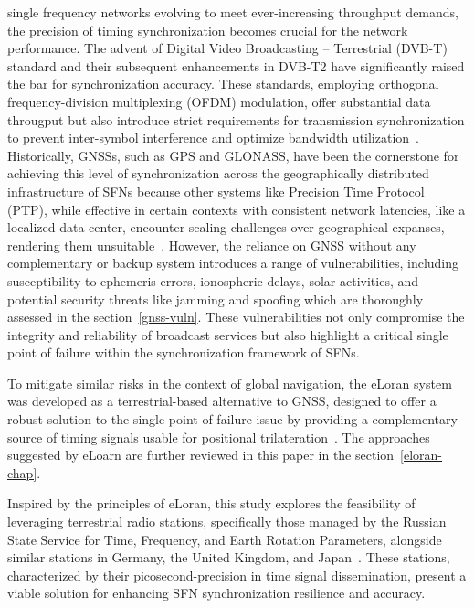 \documentclass[conference]{IEEEtran}
\begin{document}
 single frequency networks evolving to meet
ever-increasing throughput demands,  the precision of timing synchronization
becomes crucial for the network performance. The advent of Digital Video
Broadcasting -- Terrestrial (DVB-T) standard and their subsequent enhancements
in DVB-T2 have significantly raised the bar for synchronization accuracy. These
standards, employing orthogonal frequency-division multiplexing (OFDM)
modulation, offer substantial data througput but also introduce strict
requirements for transmission synchronization to prevent inter-symbol
interference and optimize bandwidth utilization~\cite{ETSIDVBT22009,liang2007timing}. Historically, GNSSs, such as GPS and GLONASS, have been the
cornerstone for achieving this level of synchronization across the
geographically distributed infrastructure of SFNs because other systems like
Precision Time Protocol (PTP), while effective in certain contexts with
consistent network latencies, like a localized data center, encounter scaling
challenges over geographical expanses, rendering them unsuitable~\cite{ieee1588_2008,ptpscale}. However,
the reliance on GNSS without any complementary or backup system introduces a
range of vulnerabilities, including susceptibility to ephemeris errors,
ionospheric delays, solar activities, and potential security threats like
jamming and spoofing which are thoroughly assessed in the section~\ref{gnss-vuln}. These
vulnerabilities not only compromise the integrity and reliability of broadcast
services but also highlight a critical single point of failure within the
synchronization framework of SFNs.

To mitigate similar risks in the context of global navigation, the eLoran
system was developed as a terrestrial-based alternative to GNSS, designed to
offer a robust solution to the single point of failure issue by providing a
complementary source of timing signals usable for positional trilateration~\cite{eloran}.
The approaches suggested by eLoarn are further reviewed in this paper in the
section~\ref{eloran-chap}.

Inspired by the principles of eLoran, this study explores the feasibility of
leveraging terrestrial radio stations, specifically those managed by the
Russian State Service for Time, Frequency, and Earth Rotation Parameters,
alongside similar stations in Germany, the United Kingdom, and Japan~\cite{itur1997standard}.
These stations, characterized by their picosecond-precision in time signal
dissemination, present a viable solution for enhancing SFN synchronization
resilience and accuracy.
\end{document}
